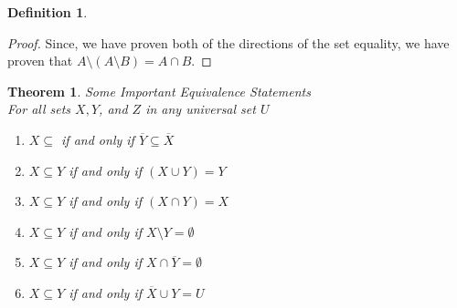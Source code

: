 \documentclass{book}
\newtheorem{theorem}{Theorem}[section]
\theoremstyle{definition}
\newtheorem{definition}{Definition}[section]
\theoremstyle{remark}
\begin{document}
\begin{definition}
\begin{proof}
            Since, we have proven both of the directions of the set equality, we have proven that $A \setminus (A \setminus B) = A \cap B$. 
        \end{proof}
\end{definition}

\newpage
\begin{theorem}
Some Important Equivalence Statements \\

For all sets $X, Y$, and $Z$ in any universal set $U$ \\

    \begin{enumerate}
        \item $X \subseteq $ if and only if $\overline{Y} \subseteq \overline{X}$
        \item $X \subseteq Y $ if and only if $(X \cup Y) = Y$
        \item $X \subseteq Y $ if and only if $ (X \cap Y) = X$
        \item $X \subseteq Y $ if and only if $ X \setminus Y = \emptyset$
        \item $X \subseteq Y $ if and only if $ X \cap \overline{Y} = \emptyset$
        \item $X \subseteq Y $ if and only if $ \overline{X} \cup Y = U$
    \end{enumerate}
\end{theorem}
\end{document}
